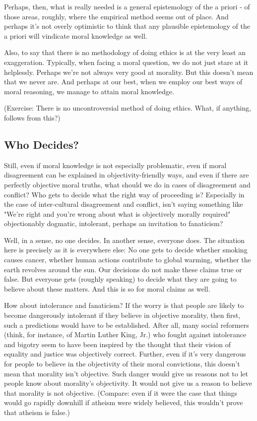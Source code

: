 Perhaps, then, what is really needed is a general epistemology of the a priori - of 
those areas, roughly, where the empirical method seems out of place. And perhaps it's 
not overly optimistic to think that any plausible epistemology of the a priori will 
vindicate moral knowledge as well.  

Also, to say that there is no methodology of doing ethics is at the very least an 
exaggeration. Typically, when facing a moral question, we do not just stare at it 
helplessly. Perhaps we're not always very good at morality. But this doesn't mean that 
we never are. And perhaps at our best, when we employ our best ways of moral 
reasoning, we manage to attain moral knowledge.  

(Exercise: There is no uncontroversial method of doing ethics. What, if anything, follows 
from this?) 
 
\subsection{Who Decides?} 
Still, even if moral knowledge is not especially problematic, even if moral disagreement 
can be explained in objectivity-friendly ways, and even if there are perfectly objective 
moral truths, what should we do in cases of disagreement and conflict? Who gets to 
decide what the right way of proceeding is? Especially in the case of inter-cultural 
disagreement and conflict, isn't saying something like "We're right and you're wrong 
about what is objectively morally required" objectionably dogmatic, intolerant, perhaps 
an invitation to fanaticism? 
 
Well, in a sense, no one decides. In another sense, everyone does. The situation 
here is precisely as it is everywhere else: No one gets to decide whether smoking causes 
cancer, whether human actions contribute to global warming, whether the earth 
revolves around the sun. Our decisions do not make these claims true or false. But 
everyone gets (roughly speaking) to decide what they are going to believe about these 
matters. And this is so for moral claims as well.  

How about intolerance and fanaticism? If the worry is that people are likely to 
become dangerously intolerant if they believe in objective morality, then first, such a 
predictions would have to be established. After all, many social reformers (think, for 
instance, of Martin Luther King, Jr.) who fought against intolerance and bigotry seem to 
have been inspired by the thought that their vision of equality and justice was
objectively correct. Further, even if it's very dangerous for people to believe in the 
objectivity of their moral convictions, this doesn't mean that morality isn’t objective. 
Such danger would give us reasons not to let people know about morality's objectivity. 
It would not give us a reason to believe that morality is not objective. (Compare: even if 
it were the case that things would go rapidly downhill if atheism were widely believed, 
this wouldn’t prove that atheism is false.) 

